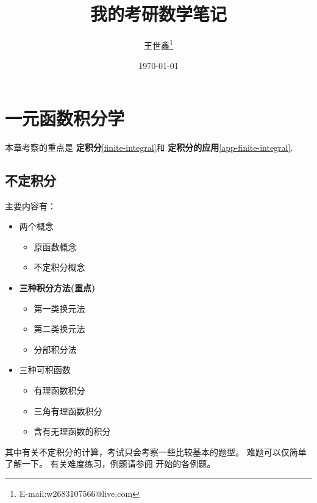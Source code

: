 \documentclass{beaulivre}
\title{我的考研数学笔记}
\author{王世鑫\thanks{E-mail:w2683107566@live.com}}
\date{\today}
\begin{document}


\tableofcontents

\mainmatter
\twocolumn


\cleardoublepage


\cleardoublepage


\cleardoublepage
\chapter{一元函数积分学}

本章考察的重点是
\textbf{定积分}\ref{finite-integral}和
\textbf{定积分的应用}\ref{app-finite-integral}.

\section{不定积分} \label{infinite-integral}

主要内容有：
\begin{itemize}
    \item 两个概念
        \begin{itemize}
            \item 原函数概念
            \item 不定积分概念
        \end{itemize}
    \item \textbf{三种积分方法(重点)}
        \begin{itemize}
            \item 第一类换元法
            \item 第二类换元法
            \item 分部积分法
        \end{itemize}
    \item 三种可积函数
        \begin{itemize}
            \item 有理函数积分
            \item 三角有理函数积分
            \item 含有无理函数的积分
        \end{itemize}
\end{itemize}
其中有关不定积分的计算，考试只会考察一些比较基本的题型。
难题可以仅简单了解一下。
有关难度练习，例题请参阅 \cite[page 96]{we} 开始的各例题。
\end{document}
